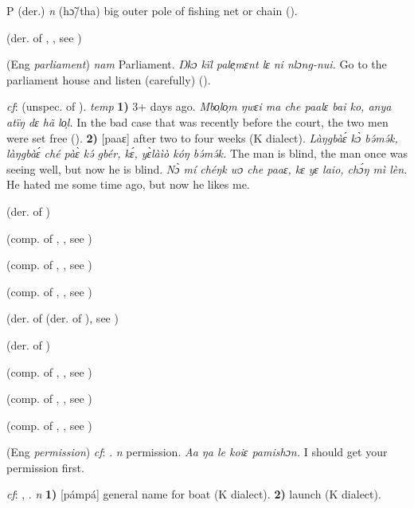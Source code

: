 \begin{letter}{P}
 (der.) \textit{n} (hɔ̃/tha) big outer pole of fishing net or chain (\citealt{Pichl1967}). 

 (der. of , , see ) 

 (Eng \textit{parliament}) \textit{nam} Parliament. \textit{Ŋkɔ kïl pale̹mɛnt lɛ ni nlɔng-nui.} Go to the parliament house and listen (carefully) (\citealt{Pichl1967}). 

 \textit{cf}:  (unspec. of ). \textit{temp} \textbf{1)} 3+ days ago. \textit{Mbo̹lo̹m ŋwɛi ma che paalɛ bai ko, anya atïŋ dɛ hã lo̹l.} In the bad case that was recently before the court, the two men were set free (\citealt{Pichl1967}). \textbf{2)} [paaɛ] after two to four weeks (K dialect). \textit{Làŋgbàɛ́ kɔ̀ bə́mə́k, làŋgbàɛ́ ché pàɛ̀ kə́ gbér, kɛ́, yɛ̀làìò kóŋ bə́mə́k.} The man is blind, the man once was seeing well, but now he is blind. \textit{Nɔ̀ mí chéŋk wɔ che paaɛ, kɛ yɛ laio, chɔ́ŋ mì lèn.} He hated me some time ago, but now he likes me.

 (der. of )

 (comp. of , , see ) 

 (comp. of , , see ) 

 (comp. of , , see ) 

 (der. of  (der. of ), see ) 

 (der. of ) 

 (comp. of , , see ) 

 (comp. of , , see ) 

 (comp. of , , see ) 

 (Eng \textit{permission}) \textit{cf}: . \textit{n} permission. \textit{Aa ŋa le koiɛ pamishɔn.} I should get your permission first.

 \textit{cf}: , . \textit{n} \textbf{1)} [pámpá] general name for boat (K dialect). \textbf{2)} launch (K dialect). 


\end{letter}

